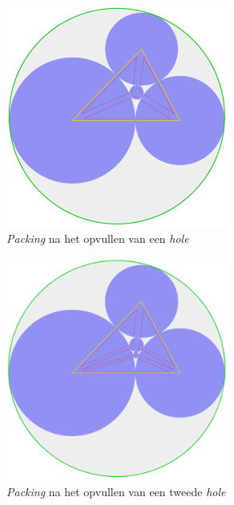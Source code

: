 \documentclass[12pt,a4paper,oneside]{book}
\begin{document}
\begin{figure}
  \centering
  \includegraphics[width=0.65\textwidth]{voorbeeld-gat-stap-2.png}
  \caption{\textit{Packing} na het opvullen van een \textit{hole}} \label{fig:voorbeeld-gat-stap-2} 
\end{figure}

\begin{figure}
  \centering
  \includegraphics[width=0.65\textwidth]{voorbeeld-gat-stap-3.png}
  \caption{\textit{Packing} na het opvullen van een tweede \textit{hole}} \label{fig:voorbeeld-gat-stap-3} 
\end{figure}
\end{document}
